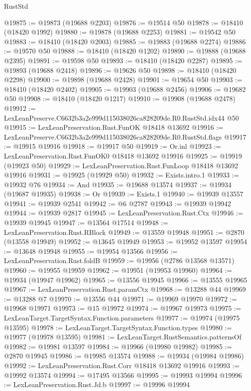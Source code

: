\begin{lexlean}{RustStd}
\begin{coremodule}
@19875 := @19873 (@19688 @2203)
@19876 := @19514 @50
@19878 := @18410 (@18420 @1992)
@19880 := @19878 (@19688 @2253)
@19881 := @19542 @50
@19883 := @18410 (@18420 @2003)
@19885 := @19883 (@19688 @2274)
@19886 := @19570 @50
@19888 := @18410 (@18420 @1202)
@19890 := @19888 (@19688 @2395)
@19891 := @19598 @50
@19893 := @18410 (@18420 @2287)
@19895 := @19893 (@19688 @2418)
@19896 := @19626 @50
@19898 := @18410 (@18420 @2298)
@19900 := @19898 (@19688 @2428)
@19901 := @19654 @50
@19903 := @18410 (@18420 @2402)
@19905 := @19903 (@19688 @2456)
@19906 := @19682 @50
@19908 := @18410 (@18420 @1217)
@19910 := @19908 (@19688 @2478)
@19912 := LexLeanPreserve.C6632b3a2e999d115038026ca828209de.R0.RustStd.idx44 @50
@19915 := LexLeanPreservation.Rust.FunOK @18418 @13692
@19916 := LexLeanPreserve.C6632b3a2e999d115038026ca828209de.R0.RustStd.flags
@19917 := @19915 @19916
@19918 := @19917 @50
@19919 := Or.inl
@19923 := LexLeanPreservation.Rust.FunOK0 @18418 @13692 @19916
@19925 := @19919 (@19923 @50)
@19929 := LexLeanPreservation.Rust.FunLoop @18418 @13692 @19916
@19931 := @19925 (@19929 @50)
@19932 := Exists.intro.{1}
@19933 := @19932 @76
@19934 := And
@19935 := @19688 @13574
@19937 := @19934 (@19687 @19935)
@19938 := Or
@19939 := Exists.{1}
@19940 := @19939 @13557
@19941 := @19939 @2541
@19942 := @6 @2787
@19943 := @19939 @19942
@19944 := @19939 @2817
@19945 := LexLeanPreservation.Rust.Ctx
@19946 := @19939 @19945
@19947 := @13564 @17514
@19948 := LexLeanPreservation.Rust.RBlock
@19949 := @13559 @19948
@19951 := @2870 (@13558 @19949)
@19952 := @13645 @19949
@19953 := @19952 @13597
@19954 := @13648 @19948
@19955 := @19954 @13566
@19956 := LexLeanPreservation.Rust.foldB
@19959 := @19956 (@2786 @13568 @13571)
@19960 := @19955 @19959
@19962 := @19951 (@19953 @19960)
@19964 := @19934 (@19947 @19962)
@19965 := @13556 @19945
@19966 := @13555 @19965
@19967 := LexLeanPreservation.Rust.paramCtx
@19968 := @13288 @44
@19969 := @13288 @7
@19970 := @13556 @44
@19971 := @19969 @19970
@19972 := @19968 @19971
@19973 := @15 @19972
@19974 := @19967 @19973
@19975 := LexLeanTarget.TargetSyntax.Function.parameters
@19977 := @19974 (@19975 @13595)
@19978 := LexLeanTarget.TargetSyntax.Function.types
@19980 := @19977 (@19978 @13595)
@19981 := LexLeanTarget.RustSemantics.patternsOf
@19982 := @19981 @13597
@19984 := @19966 (@19980 @19982)
@19985 := @2870 @19945
@19986 := @19985 @13574
@19988 := @19934 (@19984 @19986)
@19992 := LexLeanPreservation.Rust.Corr @18418 @13692 @19916
@19993 := @19992 @13574
@19994 := @17495 @13566
@19995 := @19993 @19994
@19996 := LexLeanPreservation.Rust.Jd.b
@19997 := @19996 @19994

\end{coremodule}
\end{lexlean}
